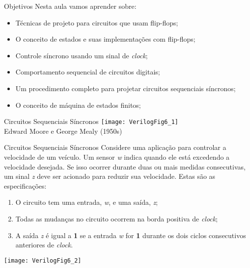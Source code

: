 

\subtitle{Circuitos Sequenciais: Máquinas de Estados Finitos} %



\begin{frame}
	\titlepage
\end{frame} 

\begin{frame}{Objetivos} 
    Nesta aula vamos aprender sobre:
    \begin{itemize}
        \item Técnicas de projeto para circuitos que usam flip-flops;
        \item O conceito de estados e suas implementações com flip-flops;
        \item Controle síncrono usando um sinal de \textit{clock};
        \item Comportamento sequencial de circuitos digitais; 
        \item Um procedimento completo para projetar circuitos sequenciais síncronos; 
        \item O conceito de máquina de estados finitos;
    \end{itemize}
\end{frame}


\begin{frame}{Circuitos Sequenciais Síncronos} \centering
    \texttt{[image: VerilogFig6\_1]} \\
    Edward Moore e George Mealy (1950s)
\end{frame}

\begin{frame}{Circuitos Sequenciais Síncronos} 
    Considere uma aplicação para controlar a velocidade de um veículo. Um sensor \textit{w} indica quando ele está excedendo a velocidade desejada. Se isso ocorrer durante duas ou mais medidas consecutivas, um sinal \textit{z} deve ser acionado para reduzir sua velocidade. Estas são as especificações:
    \begin{enumerate}
        \item O circuito tem uma entrada, \textit{w}, e uma saída, \textit{z};
        \item Todas as mudanças no circuito ocorrem na borda positiva de \textit{clock}; 
        \item A saída \textit{z} é igual a \textbf{1} se a entrada \textit{w} for \textbf{1} durante os dois ciclos consecutivos anteriores de \textit{clock}.
    \end{enumerate}
    \centering
    \texttt{[image: VerilogFig6\_2]} 
\end{frame}

